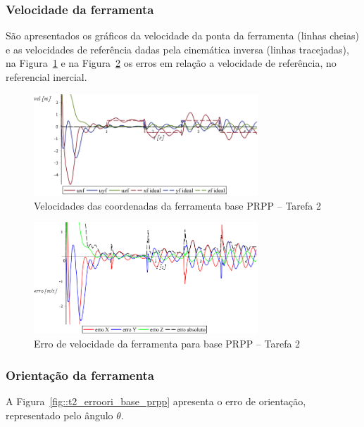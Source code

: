 \subsubsection{Velocidade da ferramenta}

São apresentados os gráficos da velocidade da ponta da ferramenta (linhas
cheias) e as velocidades de referência dadas pela cinemática inversa (linhas
tracejadas), na Figura~\ref{fig::t2_velf_base_prpp} e na
Figura~\ref{fig::t2_errovelf_base_prpp} os erros em relação a velocidade de
referência, no referencial inercial.

\begin{figure}[h!]
	\centering 
 	\includegraphics[width=0.75\textwidth]{figs/t2_velf_base_prpp}
 	\caption{Velocidades das coordenadas da ferramenta base PRPP --
 	Tarefa 2}
 	\label{fig::t2_velf_base_prpp}
\end{figure}

\begin{figure}[h!]
	\centering 
 	\includegraphics[width=0.75\textwidth]{figs/t2_errovelf_base_prpp}
 	\caption{Erro de velocidade da ferramenta para base PRPP --
 	Tarefa 2}
 	\label{fig::t2_errovelf_base_prpp}
\end{figure}

\subsubsection{Orientação da ferramenta}

A Figura~\ref{fig::t2_erroori_base_prpp} apresenta o erro de orientação,
representado pelo ângulo $\theta$.

